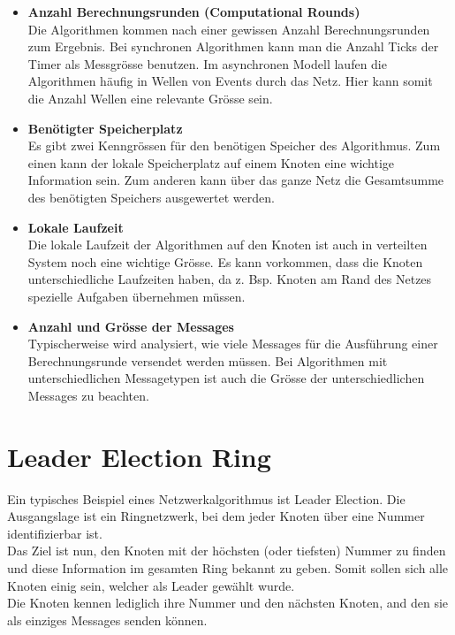 \begin{itemize}
\item \textbf{Anzahl Berechnungsrunden (Computational Rounds)}\\
Die Algorithmen kommen nach einer gewissen Anzahl Berechnungsrunden zum Ergebnis. Bei synchronen Algorithmen kann man die Anzahl Ticks der Timer als Messgrösse benutzen. Im asynchronen Modell laufen die Algorithmen häufig in Wellen von Events durch das Netz. Hier kann somit die Anzahl Wellen eine relevante Grösse sein.

\item \textbf{Benötigter Speicherplatz}\\
Es gibt zwei Kenngrössen für den benötigen Speicher des Algorithmus. Zum einen kann der lokale Speicherplatz auf einem Knoten eine wichtige Information sein. Zum anderen kann über das ganze Netz die Gesamtsumme des benötigten Speichers ausgewertet werden.

\item \textbf{Lokale Laufzeit}\\
Die lokale Laufzeit der Algorithmen auf den Knoten ist auch in verteilten System noch eine wichtige Grösse. Es kann vorkommen, dass die Knoten unterschiedliche Laufzeiten haben, da z. Bsp. Knoten am Rand des Netzes spezielle Aufgaben übernehmen müssen.

\item \textbf{Anzahl und Grösse der Messages}\\
Typischerweise wird analysiert, wie viele Messages für die Ausführung einer Berechnungsrunde versendet werden müssen. Bei Algorithmen mit unterschiedlichen Messagetypen ist auch die Grösse der unterschiedlichen Messages zu beachten.

\end{itemize}

\newpage

\section{Leader Election Ring}
Ein typisches Beispiel eines Netzwerkalgorithmus ist Leader Election. Die Ausgangslage ist ein Ringnetzwerk, bei dem jeder Knoten über eine Nummer identifizierbar ist.\\
Das Ziel ist nun, den Knoten mit der höchsten (oder tiefsten) Nummer zu finden und diese Information im gesamten Ring bekannt zu geben. Somit sollen sich alle Knoten einig sein, welcher als Leader gewählt wurde.\\
Die Knoten kennen lediglich ihre Nummer und den nächsten Knoten, and den sie als einziges Messages senden können.

